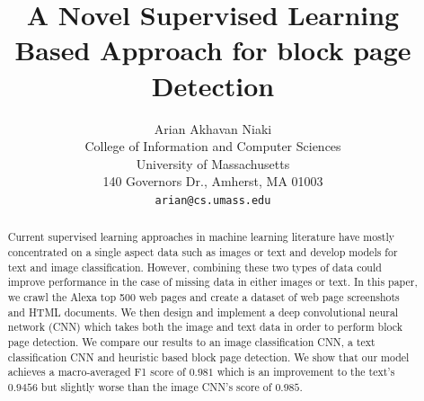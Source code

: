 \documentclass{article} %
\title{A Novel Supervised Learning Based Approach for block page Detection}
\author{
Arian Akhavan Niaki\\
College of Information and Computer Sciences\\
University of Massachusetts\\
140 Governors Dr., Amherst, MA 01003 \\
\texttt{arian@cs.umass.edu} \\
}
\begin{document}
\maketitle

\begin{abstract}
Current supervised learning approaches in machine learning literature have mostly concentrated on a single aspect data such as images or text and develop models for text and image classification. However, combining these two types of data could improve performance in the case of missing data in either images or text. In this paper, we crawl the Alexa top 500 web pages and create a dataset of web page screenshots and HTML documents. We then design and implement a deep convolutional neural network (CNN) which takes both the image and text data in order to perform block page detection. We compare our results to an image classification CNN, a text classification CNN and heuristic based block page detection. We show that our model achieves a macro-averaged F1 score of $0.981$ which is an improvement to the text's $0.9456$ but slightly worse than the image CNN's score of $0.985$.
\end{abstract}
\end{document}
